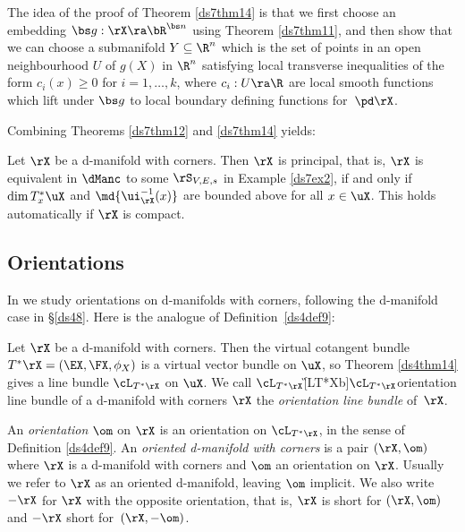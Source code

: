 \documentclass{article}
\begin{document}
The idea of the proof of Theorem \ref{ds7thm14} is that we first
choose an embedding $\bs g:\rX\ra\bR^{\bs n}$ using Theorem
\ref{ds7thm11}, and then show that we can choose a submanifold
$Y\subseteq\R^n$ which is the set of points in an open neighbourhood
$U$ of $g(X)$ in $\R^n$ satisfying local transverse inequalities of
the form $c_i(x)\ge 0$ for $i=1,\ldots,k$, where $c_i:U\ra\R$ are
local smooth functions which lift under $\bs g$ to local boundary
defining functions for~$\pd\rX$.

Combining Theorems \ref{ds7thm12} and \ref{ds7thm14} yields:

\begin{cor} Let\/ $\rX$ be a d-manifold with corners. Then $\rX$ is
principal, that is, $\rX$ is equivalent in $\dManc$ to some
$\rS_{V,E,s}$ in Example\/ {\rm\ref{ds7ex2},} if and only if\/ $\dim
T^*_x\uX$ and\/ $\md{\ui_\rX^{-1}(x)}$ are bounded above for all\/
$x\in\uX$. This holds automatically if\/ $\rX$ is
compact.
\label{ds7cor}
\end{cor}

\subsection{Orientations}
\label{ds77}

In \cite[\S 7.8]{Joyc6} we study orientations on d-manifolds with
corners, following the d-manifold case in \S\ref{ds48}. Here is the
analogue of Definition~\ref{ds4def9}:

\begin{dfn} Let $\rX$ be a d-manifold with corners. Then the
virtual cotangent bundle
$T^*\rX=(\EX,\FX,\phi_X)$ is a virtual vector bundle on $\uX$, so
Theorem \ref{ds4thm14} gives a line bundle $\cL_{T^*\rX}$ on $\uX$.
We call $\cL_{T^*\rX}$\G[LT*Xb]{$\cL_{T^*\rX}$}{orientation line
bundle of a d-manifold with corners $\rX$} the {\it orientation line
bundle\/} of~$\rX$.

An {\it orientation\/} $\om$ on $\rX$ is an orientation on
$\cL_{T^*\rX}$, in the sense of Definition \ref{ds4def9}. An {\it
oriented d-manifold with corners\/} is a pair $(\rX,\om)$ where
$\rX$ is a d-manifold with corners and $\om$ an orientation on
$\rX$. Usually we refer to $\rX$ as an oriented d-manifold, leaving
$\om$ implicit. We also write $-\rX$ for $\rX$ with the opposite
orientation, that is, $\rX$ is short for $(\rX,\om)$ and $-\rX$
short for~$(\rX,-\om)$.
\label{ds7def5}
\end{dfn}
\end{document}
